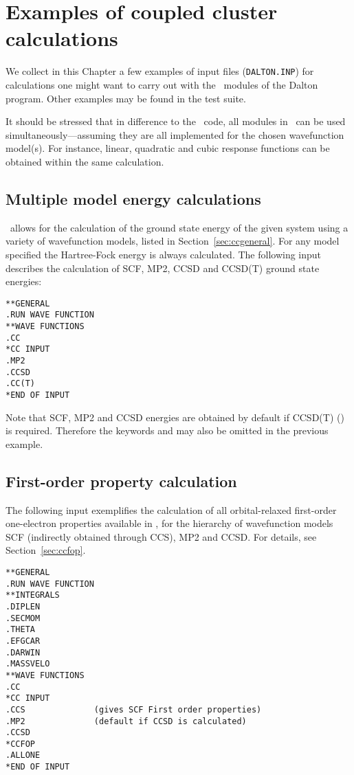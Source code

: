 \chapter{Examples of coupled cluster calculations}
\label{sec:ccexamples}

We collect in this Chapter a few examples of input files (\verb|DALTON.INP|) 
for calculations one might want to carry 
out with the \cc\ modules of the Dalton program.
Other examples may be found in the test suite. 

It should be stressed that in difference to the \resp \ code,
all modules in \cc \ can be used 
simultaneously---assuming they are all implemented
for the chosen wavefunction model(s).
For instance,  linear, quadratic and cubic response functions 
can be obtained within the same calculation.

\section{Multiple model energy calculations}
%
\cc\  allows for the calculation of the ground state energy
of the given system using a variety of wavefunction models, listed in 
Section~\ref{sec:ccgeneral}. 
For any model specified the Hartree-Fock energy is always calculated. 
The following input describes the calculation of SCF, MP2, CCSD and 
CCSD(T) ground state energies:
%
\begin{verbatim}
**GENERAL
.RUN WAVE FUNCTION
**WAVE FUNCTIONS
.CC
*CC INPUT
.MP2              
.CCSD
.CC(T)
*END OF INPUT
\end{verbatim}
Note that SCF, MP2 and CCSD energies are obtained by default if 
CCSD(T) () is required. Therefore the 
keywords  and 
may also be omitted in the previous example.

\section{First-order property calculation}

The following input exemplifies the calculation of all orbital-relaxed
first-order one-electron properties available in \cc, for the hierarchy of 
wavefunction models SCF (indirectly obtained through CCS), MP2 and CCSD.
For details, see Section~\ref{sec:ccfop}.
\begin{verbatim}
**GENERAL
.RUN WAVE FUNCTION
**INTEGRALS
.DIPLEN
.SECMOM
.THETA
.EFGCAR
.DARWIN
.MASSVELO
**WAVE FUNCTIONS
.CC
*CC INPUT
.CCS              (gives SCF First order properties)
.MP2              (default if CCSD is calculated)
.CCSD
*CCFOP
.ALLONE
*END OF INPUT
\end{verbatim}

